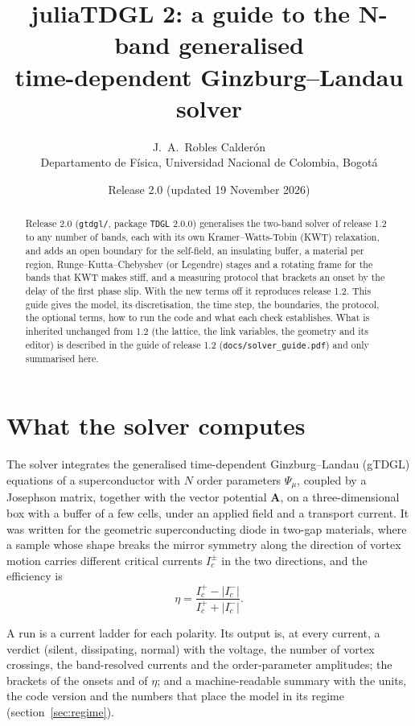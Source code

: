 \documentclass[11pt,a4paper]{article}
\title{juliaTDGL 2: a guide to the N-band generalised\\
time-dependent Ginzburg--Landau solver}
\author{J.~A.~Robles Calder\'on\\
\small Departamento de F\'isica, Universidad Nacional de Colombia, Bogot\'a}
\date{Release 2.0 (updated 19 November 2026)}
\newcommand{\code}[1]{\texttt{#1}}
\begin{document}
\sloppy
\maketitle

\begin{abstract}
\noindent
Release 2.0 (\code{gtdgl/}, package \code{TDGL} 2.0.0) generalises the two-band solver of release 1.2 to any number of
bands, each with its own Kramer--Watts-Tobin (KWT) relaxation, and adds an open boundary for the self-field, an
insulating buffer, a material per region, Runge--Kutta--Chebyshev (or Legendre) stages and a rotating frame for the bands
that KWT makes stiff, and a
measuring protocol that brackets an onset by the delay of the first phase slip. With the new terms off it reproduces
release 1.2. This guide gives the model, its discretisation, the time step, the boundaries, the protocol, the optional
terms, how to run the code and what each check establishes. What is inherited unchanged from 1.2 (the lattice, the
link variables, the geometry and its editor) is described in the guide of release 1.2 (\code{docs/solver\_guide.pdf})
and only summarised here.
\end{abstract}

\tableofcontents

\section{What the solver computes}

The solver integrates the generalised time-dependent Ginzburg--Landau (gTDGL) equations of a superconductor with $N$
order parameters $\Psi_\mu$, coupled by a Josephson matrix, together with the vector potential $\mathbf A$, on a
three-dimensional box with a buffer of a few cells, under an applied field and a transport current. It was written
for the geometric superconducting diode in two-gap materials, where a sample whose shape breaks the mirror symmetry
along the direction of vortex motion carries different critical currents $I_c^\pm$ in the two directions, and the
efficiency is
\begin{equation}
  \eta = \frac{I_c^{+}-|I_c^{-}|}{I_c^{+}+|I_c^{-}|}.
\end{equation}

A run is a current ladder for each polarity. Its output is, at every current, a verdict (silent, dissipating, normal)
with the voltage, the number of vortex crossings, the band-resolved currents and the order-parameter amplitudes;
the brackets of the onsets and of $\eta$; and a machine-readable summary with the units, the code version and the
numbers that place the model in its regime (section~\ref{sec:regime}).
\end{document}
